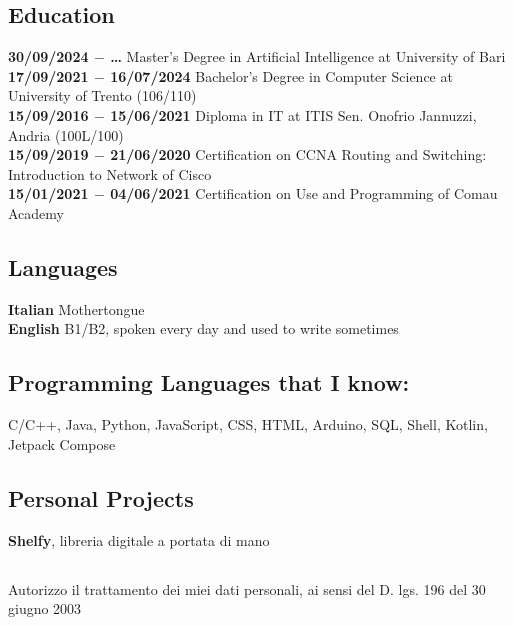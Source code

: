 \documentclass[12pt]{article}
\begin{document}
\subsection*{Education}
\textbf{30/09/2024 $-$ \dots} Master's Degree in Artificial Intelligence at University of Bari\\
\textbf{17/09/2021 $-$ 16/07/2024} Bachelor's Degree in Computer Science at University of Trento (106/110)\\
\textbf{15/09/2016 $-$ 15/06/2021} Diploma in IT at ITIS Sen. Onofrio Jannuzzi, Andria (100L/100)\\
\textbf{15/09/2019 $-$ 21/06/2020} Certification on CCNA Routing and Switching: Introduction to Network of Cisco\\
\textbf{15/01/2021 $-$ 04/06/2021} Certification on Use and Programming of Comau Academy
\subsection*{Languages}
\textbf{Italian} Mothertongue\\
\textbf{English} B1/B2, spoken every day and used to write sometimes
\subsection*{Programming Languages that I know:} C/C++, Java, Python, JavaScript, CSS, HTML, Arduino, SQL, Shell, Kotlin, Jetpack Compose
\subsection*{Personal Projects}
\textbf{Shelfy}, libreria digitale a portata di mano
\subsection*{}
Autorizzo il trattamento dei miei dati personali, ai sensi del D. lgs. 196 del 30 giugno 2003
\end{document}
